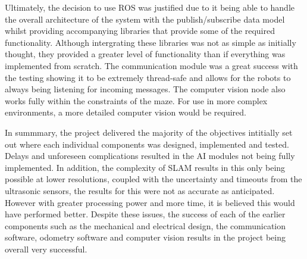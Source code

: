 Ultimately, the decision to use ROS was justified due to it being able to handle
the overall architecture of the system with the publish/subscribe data model
whilst providing accompanying libraries that provide some of the required 
functionality. Although intergrating these libraries was not as simple as 
initially thought, they provided a greater level of functionality than if 
everything was implemented from scratch. The communication module was a great
success with the testing showing it to be extremely thread-safe and allows for
the robots to always being listening for incoming messages. The computer vision
node also works fully within the constraints of the maze. For use in more complex 
environments, a more detailed computer vision would be required.

In summmary, the project delivered the majority of the objectives intitially set
out where each individual components was designed, implemented and tested. Delays
and unforeseen complications resulted in the AI modules not being fully implemented. 
In addition, the complexity of SLAM results in this only being possible at lower 
resolutions, coupled with the uncertainty and timeouts from the ultrasonic sensors, 
the results for this were not as accurate as anticipated. However with greater 
processing power and more time, it is believed this would have performed better.
Despite these issues, the success of each of the earlier components
such as the mechanical and electrical design, the communication software, odometry 
software and computer vision results in the project being overall very successful.